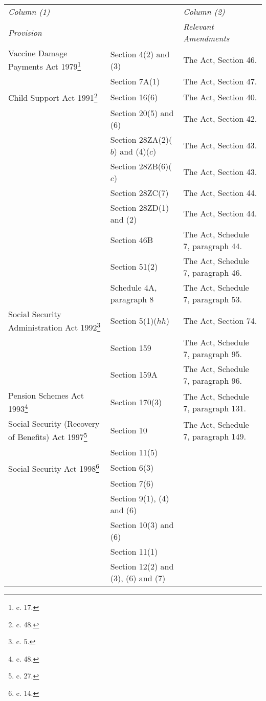 \documentclass[12pt,a4paper]{article}
\begin{document}
{\footnotesize{}
\begin{longtable}{p{150pt}p{102pt}p{102pt}}
\hline
\itshape Column (1) & & \itshape Column (2)\\
\itshape Provision & & \itshape Relevant Amendments\\
\hline
\endhead
\hline
\endlastfoot
Vaccine Damage Payments Act 1979\footnote{\frenchspacing 1979 c. 17.}&Section 4(2) and (3)&The Act, Section 46.\\
&Section 7A(1)&The Act, Section 47.\\
Child Support Act 1991\footnote{\frenchspacing 1991 c. 48.}&Section 16(6)&The Act, Section 40.\\
&Section 20(5) and (6)&The Act, Section 42.\\
&Section 28ZA(2)($b$) and (4)($c$)&The Act, Section 43.\\
&Section 28ZB(6)($c$)&The Act, Section 43.\\
&Section 28ZC(7)&The Act, Section 44.\\
&Section 28ZD(1) and (2)&The Act, Section 44.\\
&Section 46B&The Act, Schedule 7, paragraph 44.\\
&Section 51(2)&The Act, Schedule 7, paragraph 46.\\
&Schedule 4A, paragraph 8&The Act, Schedule 7, paragraph 53.\\
Social Security Administration Act 1992\footnote{\frenchspacing 1992 c. 5.}&Section 5(1)($hh$)&The Act, Section 74.\\
&Section 159&The Act, Schedule 7, paragraph 95.\\
&Section 159A&The Act, Schedule 7, paragraph 96.\\
Pension Schemes Act 1993\footnote{\frenchspacing 1993 c. 48.}&Section 170(3)&The Act, Schedule 7, paragraph 131.\\
Social Security (Recovery of Benefits) Act 1997\footnote{\frenchspacing 1997 c. 27.}&Section 10&The Act, Schedule 7, paragraph 149.\\
&Section 11(5)\\
Social Security Act 1998\footnote{\frenchspacing 1998 c. 14.}&Section 6(3)\\
&Section 7(6)\\
&Section 9(1), (4) and (6)\\
&Section 10(3) and (6)\\
&Section 11(1)\\
&Section 12(2) and (3), (6) and (7)\\

\end{longtable}}
\end{document}
